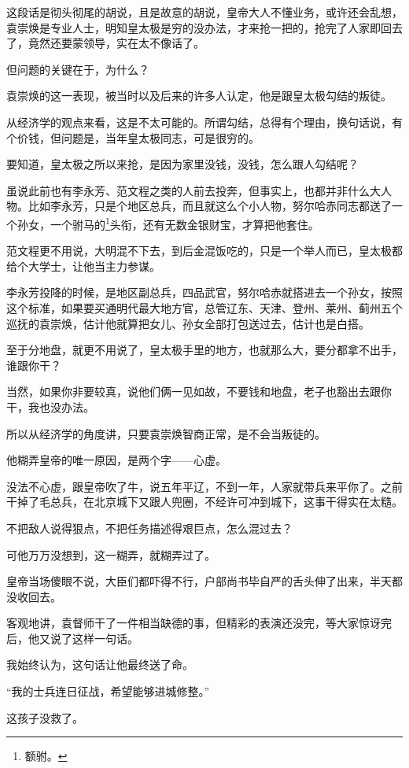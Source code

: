 \begin{multicols}{\theparacolNo}
		这段话是彻头彻尾的胡说，且是故意的胡说，皇帝大人不懂业务，或许还会乱想，袁崇焕是专业人士，明知皇太极是穷的没办法，才来抢一把的，抢完了人家即回去了，竟然还要蒙领导，实在太不像话了。

		但问题的关键在于，为什么？

		袁崇焕的这一表现，被当时以及后来的许多人认定，他是跟皇太极勾结的叛徒。

		从经济学的观点来看，这是不太可能的。所谓勾结，总得有个理由，换句话说，有个价钱，但问题是，当年皇太极同志，可是很穷的。

		要知道，皇太极之所以来抢，是因为家里没钱，没钱，怎么跟人勾结呢？

		虽说此前也有李永芳、范文程之类的人前去投奔，但事实上，也都并非什么大人物。比如李永芳，只是个地区总兵，而且就这么个小人物，努尔哈赤同志都送了一个孙女，一个驸马的\footnote{额驸。}头衔，还有无数金银财宝，才算把他套住。

		范文程更不用说，大明混不下去，到后金混饭吃的，只是一个举人而已，皇太极都给个大学士，让他当主力参谋。

		李永芳投降的时候，是地区副总兵，四品武官，努尔哈赤就搭进去一个孙女，按照这个标准，如果要买通明代最大地方官，总管辽东、天津、登州、莱州、蓟州五个巡抚的袁崇焕，估计他就算把女儿、孙女全部打包送过去，估计也是白搭。

		至于分地盘，就更不用说了，皇太极手里的地方，也就那么大，要分都拿不出手，谁跟你干？

		当然，如果你非要较真，说他们俩一见如故，不要钱和地盘，老子也豁出去跟你干，我也没办法。

		所以从经济学的角度讲，只要袁崇焕智商正常，是不会当叛徒的。

		他糊弄皇帝的唯一原因，是两个字——心虚。

		没法不心虚，跟皇帝吹了牛，说五年平辽，不到一年，人家就带兵来平你了。之前干掉了毛总兵，在北京城下又跟人兜圈，不经许可冲到城下，这事干得实在太糙。

		不把敌人说得狠点，不把任务描述得艰巨点，怎么混过去？

		可他万万没想到，这一糊弄，就糊弄过了。

		皇帝当场傻眼不说，大臣们都吓得不行，户部尚书毕自严的舌头伸了出来，半天都没收回去。

		客观地讲，袁督师干了一件相当缺德的事，但精彩的表演还没完，等大家惊讶完后，他又说了这样一句话。

		我始终认为，这句话让他最终送了命。

		“我的士兵连日征战，希望能够进城修整。”

		这孩子没救了。


\end{multicols}

